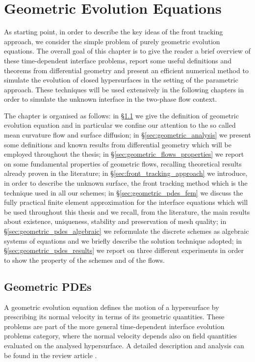 \chapter{\sc Geometric Evolution Equations}\label{ch:geometric_pdes}
As starting point, in order to describe the key ideas of the front tracking
approach, we consider the simple problem of purely geometric evolution
equations. The overall goal of this chapter is to give the reader a brief
overview of these time-dependent interface problems, report some useful
definitions and theorems from differential geometry and present an efficient
numerical method to simulate the evolution of closed hypersurfaces in the
setting of the parametric approach. These techniques will be used extensively
in the following chapters in order to simulate the unknown interface in the
two-phase flow context.

The chapter is organised as follows: in \S\ref{sec:geometric_pdes} we
give the definition of geometric evolution equation and in particular we
confine our attention to the so called mean curvature flow and surface
diffusion; in \S\ref{sec:geometric_analysis} we present some definitions
and known results from differential geometry which will be employed throughout
the thesis; in \S\ref{sec:geometric_flows_properties} we report on some
fundamental properties of geometric flows, recalling theoretical results already
proven in the literature; in \S\ref{sec:front_tracking_approach} we
introduce, in order to describe the unknown surface, the front tracking method
which is the technique used in all our schemes; in
\S\ref{sec:geometric_pdes_fem} we discuss the fully practical finite
element approximation for the interface equations which will be used throughout
this thesis and we recall, from the literature, the main results about
existence, uniqueness, stability and preservation of mesh quality; in
\S\ref{sec:geometric_pdes_algebraic} we reformulate the discrete schemes
as algebraic systems of equations and we briefly describe the solution technique
adopted; in \S\ref{sec:geometric_pdes_results} we report on three different
experiments in order to show the property of the schemes and of the flows.

\section{Geometric PDEs}\label{sec:geometric_pdes}
A geometric evolution equation defines the motion of a hypersurface
by prescribing its normal velocity in terms of its geometric quantities. These
problems are part of the more general time-dependent interface evolution
problems category, where the normal velocity depends also on field quantities
evaluated on the analysed hypersurface. A detailed description and analysis can
be found in the review article \cite{DeckelnickDE05}.

